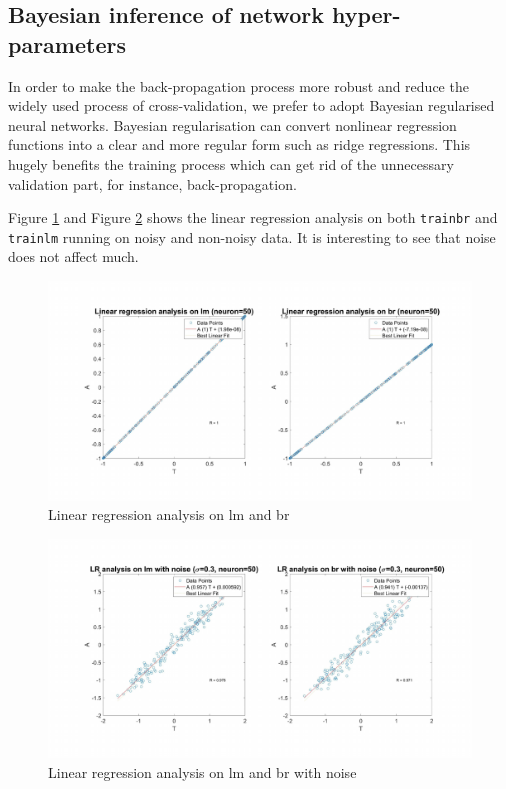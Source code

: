 \documentclass{article}
\begin{document}
\subsection{Bayesian inference of network hyper-parameters}

In order to make the back-propagation process more robust and reduce the widely used process of cross-validation, we prefer to adopt Bayesian regularised neural networks. Bayesian regularisation can convert nonlinear regression functions into a clear and more regular form such as ridge regressions. This hugely benefits the training process which can get rid of the unnecessary validation part, for instance, back-propagation.

Figure \ref{fig:brlmnonoise} and Figure \ref{fig:brlmwithnoise} shows the linear regression analysis on both \verb|trainbr| and \verb|trainlm| running on noisy and non-noisy data. It is interesting to see that noise does not affect much.

\begin{figure}[h!]
  \centering
  \includegraphics[width=\textwidth]{lab1/nonoisetrainbrcompare.pdf}
  \caption{Linear regression analysis on lm and br}
  \label{fig:brlmnonoise}
\end{figure}

\begin{figure}[h!]
  \centering
  \includegraphics[width=\textwidth]{lab1/noisetrainbrcompare.pdf}
  \caption{Linear regression analysis on lm and br with noise}
  \label{fig:brlmwithnoise}
\end{figure}
\end{document}
